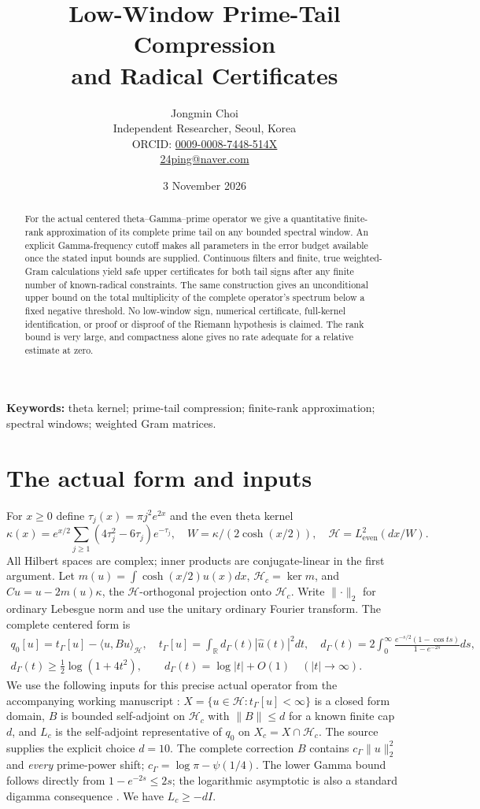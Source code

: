 \documentclass[11pt]{article}
\title{Low-Window Prime-Tail Compression\\and Radical Certificates}
\author{Jongmin Choi\\\small Independent Researcher, Seoul, Korea\\\small ORCID: \href{https://orcid.org/0009-0008-7448-514X}{0009-0008-7448-514X}\\\small \href{mailto:24ping@naver.com}{24ping@naver.com}}
\date{3 November 2026}
\newcommand{\R}{\mathbb R}\newcommand{\Hh}{\mathcal H}\newcommand{\Nn}{\mathcal N}\newcommand{\Kk}{\mathcal K}\newcommand{\norm}[1]{\lVert#1\rVert}\newcommand{\ip}[2]{\langle #1,#2\rangle}\newcommand{\dom}{\operatorname{Dom}}
\begin{document}
\maketitle
\begin{abstract}
For the actual centered theta--Gamma--prime operator we give a quantitative finite-rank approximation of its complete prime tail on any bounded spectral window. An explicit Gamma-frequency cutoff makes all parameters in the error budget available once the stated input bounds are supplied. Continuous filters and finite, true weighted-Gram calculations yield safe upper certificates for both tail signs after any finite number of known-radical constraints. The same construction gives an unconditional upper bound on the total multiplicity of the complete operator's spectrum below a fixed negative threshold. No low-window sign, numerical certificate, full-kernel identification, or proof or disproof of the Riemann hypothesis is claimed. The rank bound is very large, and compactness alone gives no rate adequate for a relative estimate at zero.
\end{abstract}
\noindent\textbf{Keywords:} theta kernel; prime-tail compression; finite-rank approximation; spectral windows; weighted Gram matrices.

\section{The actual form and inputs}\label{sec:setting}
For $x\ge0$ define $\tau_j(x)=\pi j^2e^{2x}$ and the even theta kernel
\[\kappa(x)=e^{x/2}\sum_{j\ge1}(4\tau_j^2-6\tau_j)e^{-\tau_j},\quad
 W=\kappa/(2\cosh(x/2)),\quad \Hh=L^2_{\mathrm{even}}(dx/W).\]
All Hilbert spaces are complex; inner products are conjugate-linear in the first argument. Let $m(u)=\int\cosh(x/2)u(x)dx$, $\Hh_c=\ker m$, and $C u=u-2m(u)\kappa$, the $\Hh$-orthogonal projection onto $\Hh_c$. Write $\norm{\cdot}_2$ for ordinary Lebesgue norm and use the unitary ordinary Fourier transform. The complete centered form is
\begin{gather*}
 q_0[u]=t_\Gamma[u]-\ip{u}{B u}_{\Hh},\quad t_\Gamma[u]=\int_{\R}d_\Gamma(t)|\widehat u(t)|^2dt,\quad d_\Gamma(t)=2\int_0^\infty\frac{e^{-s/2}(1-\cos ts)}{1-e^{-2s}}ds,\\
 d_\Gamma(t)\ge\tfrac12\log(1+4t^2),\qquad d_\Gamma(t)=\log|t|+O(1)\quad(|t|\to\infty).
\end{gather*}
We use the following inputs for this precise actual operator from the accompanying working manuscript \cite{source}: $X=\{u\in\Hh:t_\Gamma[u]<\infty\}$ is a closed form domain, $B$ is bounded self-adjoint on $\Hh_c$ with $\norm B\le d$ for a known finite cap $d$, and $L_c$ is the self-adjoint representative of $q_0$ on $X_c=X\cap\Hh_c$. The source supplies the explicit choice $d=10$. The complete correction $B$ contains $c_\Gamma\norm u_2^2$ and \emph{every} prime-power shift; $c_\Gamma=\log\pi-\psi(1/4)$. The lower Gamma bound follows directly from $1-e^{-2s}\le2s$; the logarithmic asymptotic is also a standard digamma consequence \cite{dlmf}. We have $L_c\ge-dI$.
\end{document}

